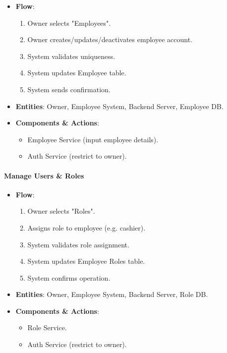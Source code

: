 \documentclass[]{VUMIFTemplateClass}
\begin{document}
\begin{itemize}
    \item \textbf{Flow}: \begin{enumerate}
    \item Owner selects "Employees".
    \item Owner creates/updates/deactivates employee account.
    \item System validates uniqueness.
    \item System updates Employee table.
    \item System sends confirmation.
    \end{enumerate}
    \item \textbf{Entities}: Owner, Employee System, Backend Server, Employee DB.
    \item \textbf{Components \& Actions}: \begin{itemize}
        \item Employee Service (input employee details).
        \item Auth Service (restrict to owner).
    \end{itemize}
\end{itemize}

\paragraph{Manage Users \& Roles}

\begin{itemize}
    \item \textbf{Flow}: \begin{enumerate}
    \item Owner selects "Roles".
    \item Assigns role to employee (e.g. cashier).
    \item System validates role assignment.
    \item System updates Employee Roles table.
    \item System confirms operation.
    \end{enumerate}
    \item \textbf{Entities}: Owner, Employee System, Backend Server, Role DB.
    \item \textbf{Components \& Actions}: \begin{itemize}
        \item Role Service.
        \item Auth Service (restrict to owner).
    \end{itemize}
\end{itemize}
\end{document}
